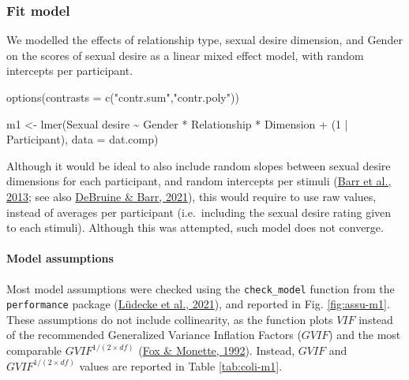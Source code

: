 \documentclass[
  bookmarksnumbered]{article}
\newenvironment{Shaded}{\begin{snugshade}}{\end{snugshade}}
\newcommand{\AttributeTok}[1]{\textcolor[rgb]{0.80,0.80,0.80}{#1}}
\newcommand{\DecValTok}[1]{\textcolor[rgb]{0.86,0.86,0.80}{#1}}
\newcommand{\FunctionTok}[1]{\textcolor[rgb]{0.94,0.94,0.56}{#1}}
\newcommand{\NormalTok}[1]{\textcolor[rgb]{0.80,0.80,0.80}{#1}}
\newcommand{\OtherTok}[1]{\textcolor[rgb]{0.94,0.94,0.56}{#1}}
\newcommand{\SpecialCharTok}[1]{\textcolor[rgb]{0.86,0.64,0.64}{#1}}
\newcommand{\StringTok}[1]{\textcolor[rgb]{0.80,0.58,0.58}{#1}}
\begin{document}
\hypertarget{fit-model}{%
\subsubsection{Fit model}\label{fit-model}}

We modelled the effects of relationship type, sexual desire dimension, and Gender on the scores of sexual desire as a linear mixed effect model, with random intercepts per participant.

\begin{Shaded}
\begin{Highlighting}[]
\FunctionTok{options}\NormalTok{(}\AttributeTok{contrasts =} \FunctionTok{c}\NormalTok{(}\StringTok{"contr.sum"}\NormalTok{,}\StringTok{"contr.poly"}\NormalTok{))}

\NormalTok{m1 }\OtherTok{\textless{}{-}} \FunctionTok{lmer}\NormalTok{(}\StringTok{\textasciigrave{}}\AttributeTok{Sexual desire}\StringTok{\textasciigrave{}} \SpecialCharTok{\textasciitilde{}}\NormalTok{ Gender }\SpecialCharTok{*}\NormalTok{ Relationship }\SpecialCharTok{*}\NormalTok{ Dimension }\SpecialCharTok{+} 
\NormalTok{            (}\DecValTok{1} \SpecialCharTok{|}\NormalTok{ Participant), }
            \AttributeTok{data =}\NormalTok{ dat.comp)}
\end{Highlighting}
\end{Shaded}

Although it would be ideal to also include random slopes between sexual desire dimensions for each participant, and random intercepts per stimuli (\protect\hyperlink{ref-barr2013}{Barr et al., 2013}; see also \protect\hyperlink{ref-debruine2021}{DeBruine \& Barr, 2021}), this would require to use raw values, instead of averages per participant (i.e.~including the sexual desire rating given to each stimuli). Although this was attempted, such model does not converge.

\hypertarget{model-assumptions}{%
\paragraph{Model assumptions}\label{model-assumptions}}

Most model assumptions were checked using the \texttt{check\_model} function from the \texttt{performance} package (\protect\hyperlink{ref-ludecke2021}{Lüdecke et al., 2021}), and reported in Fig. \ref{fig:assu-m1}. These assumptions do not include collinearity, as the function plots \(VIF\) instead of the recommended Generalized Variance Inflation Factors (\(GVIF\)) and the most comparable \(GVIF^{{1}/{(2 \times df)}}\) (\protect\hyperlink{ref-fox1992}{Fox \& Monette, 1992}). Instead, \(GVIF\) and \(GVIF^{{1}/{(2 \times df)}}\) values are reported in Table \ref{tab:coli-m1}.
\end{document}
